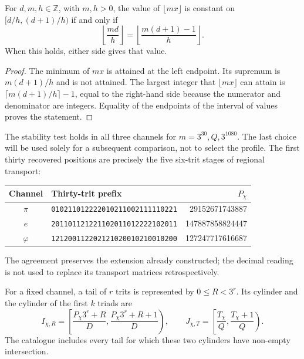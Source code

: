 \begin{lemma}
\label{censo:estabilidad}
For \(d,m,h\in\mathbb Z\), with \(m,h>0\), the value of
\(\lfloor mx\rfloor\) is constant on \([d/h,(d+1)/h)\) if and only if
\begin{equation}
 \left\lfloor\frac{md}{h}\right\rfloor
 =\left\lfloor\frac{m(d+1)-1}{h}\right\rfloor.
 \label{censo:prueba-estabilidad}
\end{equation}
When this holds, either side gives that value.
\end{lemma}
\begin{proof}
The minimum of \(mx\) is attained at the left endpoint. Its supremum
is \(m(d+1)/h\) and is not attained. The largest integer that
\(\lfloor mx\rfloor\) can attain is
\(\lceil m(d+1)/h\rceil-1\), equal to the right-hand side because
the numerator and denominator are integers. Equality of the endpoints
of the interval of values proves the statement.
\end{proof}

The stability test holds in all three channels for
\(m=3^{30},Q,3^{1080}\). The last choice will be used solely
for a subsequent comparison, not to select the profile. The
first thirty recovered positions are precisely the five
six-trit stages of regional transport:
\begin{center}\small
\begin{tabular}{@{}c l r@{}}\toprule
Channel&Thirty-trit prefix&\(P_\chi\)\\\midrule
\(\pi\)&\texttt{010211012222010211002111110221}&29152671743887\\
\(e\)&\texttt{201101121221102011012222102011}&147887858824447\\
\(\varphi\)&\texttt{121200112202121020010210010200}&127247717616687\\\bottomrule
\end{tabular}
\end{center}
The agreement preserves the extension already constructed; the decimal
reading is not used to replace its transport matrices retrospectively.

For a fixed channel, a tail of \(r\) trits is represented by
\(0\leq R<3^r\). Its cylinder and the cylinder of the first \(k\)
triads are
\begin{equation}
 I_{\chi,R}=\left[\frac{P_\chi3^r+R}{D},
                       \frac{P_\chi3^r+R+1}{D}\right),\qquad
 J_{\chi,T}=\left[\frac{T_\chi}{Q},\frac{T_\chi+1}{Q}\right).
 \label{censo:dos-cilindros}
\end{equation}
The catalogue includes every tail for which these two cylinders
have non-empty intersection.

